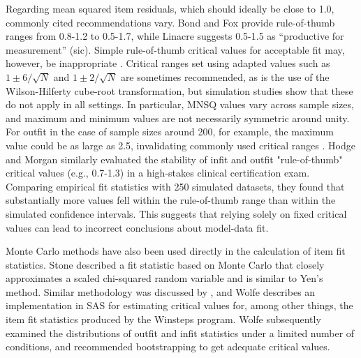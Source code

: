 \documentclass[11pt,a4paper]{article}
\begin{document}
Regarding mean squared item residuals, which should ideally be close to 1.0, commonly cited recommendations vary. Bond and Fox \citeyear{Bond-Fox-2015} provide rule-of-thumb ranges from 0.8-1.2 to 0.5-1.7, while Linacre \citeyear{Linacre-2002} suggests 0.5-1.5 as “productive for measurement” (sic). Simple rule-of-thumb critical values for acceptable fit may, however, be inappropriate \cite{Smith-Schumacker-Bush-et-al-1998,Wang-Chen-2005}. Critical ranges set using adapted values such as $1\pm6/\sqrt{N}$ and $1\pm2/\sqrt{N}$ are sometimes recommended, as is the use of the Wilson-Hilferty cube-root transformation, but simulation studies show that these do not apply in all settings. In particular, MNSQ values vary across sample sizes, and maximum and minimum values are not necessarily symmetric around unity. For outfit in the case of sample sizes around 200, for example, the maximum value could be as large as 2.5, invalidating commonly used critical ranges \cite{Wang-Chen-2005,Seol-2016}. Hodge and Morgan \citeyear{Hodge-Morgan-2017} similarly evaluated the stability of infit and outfit "rule-of-thumb" critical values (e.g., 0.7-1.3) in a high-stakes clinical certification exam. Comparing empirical fit statistics with 250 simulated datasets, they found that substantially more values fell within the rule-of-thumb range than within the simulated confidence intervals. This suggests that relying solely on fixed critical values can lead to incorrect conclusions about model-data fit.

Monte Carlo methods have also been used directly in the calculation of item fit statistics. Stone \citeyear{Stone-2000} described a fit statistic based on Monte Carlo that closely approximates a scaled chi-squared random variable and is similar to Yen's \citeyear{Yen-1981} method. Similar methodology was discussed by , and Wolfe \citeyear{Wolfe-2008} describes an implementation in SAS for estimating critical values for, among other things, the item fit statistics produced by the Winsteps program. Wolfe \citeyear{Wolfe-2013} subsequently examined the distributions of outfit and infit statistics under a limited number of conditions, and recommended bootstrapping to get adequate critical values. 
\end{document}
